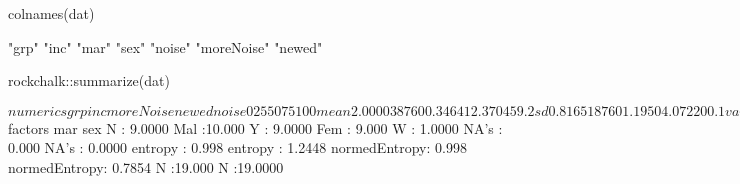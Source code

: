 \begin{Schunk}
\begin{Sinput}
  colnames(dat)
\end{Sinput}
\begin{Soutput}
[1] "grp"       "inc"       "mar"       "sex"       "noise"     "moreNoise" "newed"    
\end{Soutput}
\begin{Sinput}
  rockchalk::summarize(dat)
\end{Sinput}
\begin{Soutput}
$numerics
         grp       inc moreNoise  newed   noise
0%    1.0000     11110   -1.6620  6.000    18.6
25%   1.0000     23170   -0.4029  9.500   352.1
50%   2.0000     34330    0.4912 12.000   418.4
75%   3.0000     44390    1.1340 14.500   588.6
100%  3.0000     78790    2.1970 20.000   869.3
mean  2.0000     38760    0.3464 12.370   459.2
sd    0.8165     18760    1.1950  4.072   200.1
var   0.6667 351900000    1.4290 16.580 40040.0
NA's  0.0000         0    0.0000  0.000     0.0
N    19.0000        19   19.0000 19.000    19.0

$factors
            mar                     sex        
 N            : 9.0000   Mal          :10.000  
 Y            : 9.0000   Fem          : 9.000  
 W            : 1.0000   NA's         : 0.000  
 NA's         : 0.0000   entropy      : 0.998  
 entropy      : 1.2448   normedEntropy: 0.998  
 normedEntropy: 0.7854   N            :19.000  
 N            :19.0000                         
\end{Soutput}
\end{Schunk}
